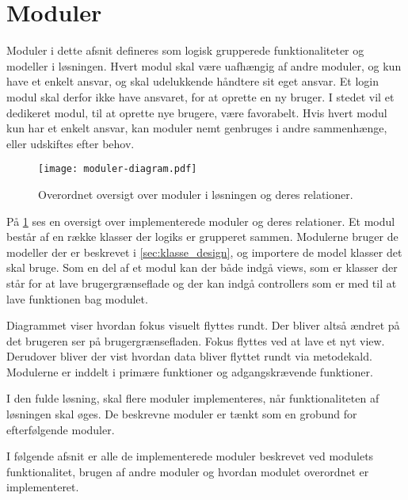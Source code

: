 \section{Moduler}
\label{sec:moduler}

Moduler i dette afsnit defineres som logisk grupperede funktionaliteter og modeller i løsningen. Hvert modul skal være uafhængig af andre moduler, og kun have et enkelt ansvar, og skal udelukkende håndtere sit eget ansvar. Et login modul skal derfor ikke have ansvaret, for at oprette en ny bruger. I stedet vil et dedikeret modul, til at oprette nye brugere, være favorabelt. Hvis hvert modul kun har et enkelt ansvar, kan moduler nemt genbruges i andre sammenhænge, eller udskiftes efter behov.

\begin{figure}
  \centering
  \texttt{[image: moduler-diagram.pdf]}
  \caption{Overordnet oversigt over moduler i løsningen og deres relationer.}
  \label{fig:mod}
\end{figure}


På \cref{fig:mod} ses en oversigt over implementerede moduler og deres relationer. Et modul består af en række klasser der logiks er grupperet sammen. Modulerne bruger de modeller der er beskrevet i \cref{sec:klasse_design}, og importere de model klasser det skal bruge. Som en del af et modul kan der både indgå views, som er klasser der står for at lave brugergrænseflade og der kan indgå controllers som er med til at lave funktionen bag modulet.


Diagrammet viser hvordan fokus visuelt flyttes rundt. Der bliver altså ændret på det brugeren ser på brugergrænsefladen. Fokus flyttes ved at lave et nyt view. Derudover bliver der vist hvordan data bliver flyttet rundt via metodekald. Modulerne er inddelt i primære funktioner og adgangskrævende funktioner.

I den fulde løsning, skal flere moduler implementeres, når funktionaliteten af løsningen skal øges. De beskrevne moduler er tænkt som en grobund for efterfølgende moduler.

I følgende afsnit er alle de implementerede moduler beskrevet ved modulets funktionalitet, brugen af andre moduler og hvordan modulet overordnet er implementeret.









